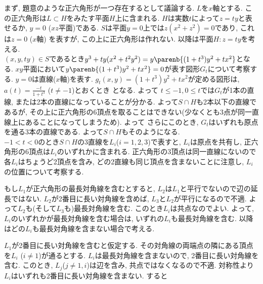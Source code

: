 まず, 題意のような正六角形が一つ存在するとして議論する. $L$を$x$軸とする. この正六角形は$L\subset H$をみたす平面$H$上に含まれる. $H$は実数$t$によって$z=ty$と表せるか, $y=0$ ($xz$平面)である. $S$は平面$y = 0$上では$z(x^2 + z^2) = 0$であり, これは$z=0$ ($x$軸) を表すが, この上に正六角形は作れない. 以降は平面$H: z=ty$を考える. \\
$(x,y,ty)\in S$であるとき$y^3 + ty(x^2 + t^2y^2) = y\parenb{(1+t^3)y^2 + tx^2}$となる. $xy$平面において$y\parenb{(1+t^3)y^2 + tx^2} = 0$が表す図形$G_t$について考察する. $y = 0$は直線($x$軸)を表す. $g_t(x,y) = (1+t^3)y^2 + tx^2$が定める図形は, $a(t) = \frac{-t}{1+t^3}$ ($t\neq -1$)とおくとき
となる. よって $t\leq -1, 0\leq t$では$G_t$が1本の直線, または2本の直線になっていることが分かる. よって$S\cap H$も2本以下の直線であるが, その上に正六角形の6頂点を取ることはできない(少なくとも3点が同一直線上にあることになってしまうため). よって さらにこのとき, $G_t$はいずれも原点を通る3本の直線である. よって$S\cap H$もそのようになる.  \\
$-1 < t < 0$のとき$S\cap H$の3直線を$L_i$($i=1,2,3$)で表すと, $L_i$は原点を共有し, 正六角形の6頂点は$L_i$のいずれかに含まれる. 正六角形の3頂点は同一直線にないので各$L_i$はちょうど2頂点を含み, どの2直線も同じ頂点を含まないことに注意し, $L_i$の位置について考察する. \par
もし$L_1$が正六角形の最長対角線を含むとすると, $L_2$は$L_1$と平行でないので辺の延長ではない. $L_2$が2番目に長い対角線を含めば, $L_3$と$L_2$が平行になるので不適. よって$L_2$も(そして$L_3$も)最長対角線を含む. このとき$L_i$は共点なのでよい. よって, $L_i$のいずれかが最長対角線を含む場合は, いずれの$L_i$も最長対角線を含む. 以降はどの$L_i$も最長対角線を含まない場合で考える. \par
$L_1$が2番目に長い対角線を含むと仮定する. その対角線の両端点の隣にある頂点を$L_i$ ($i\neq 1$)が通るとする. $L_i$は最長対角線を含まないので, 2番目に長い対角線を含む. このとき, $L_j$($j\neq 1,i$)は辺を含み, 共点ではなくなるので不適. 対称性より$L_i$はいずれも2番目に長い対角線を含まない. すると
